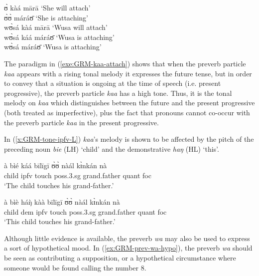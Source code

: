 \begin{exe}
\begin{exe}
\begin{exe}
{\begin{exe}
\begin{exe}
\begin{exe}
\begin{exe}
\begin{exe}
\begin{exe}
\begin{exe}
\begin{xlist}
\begin{exe}
\begin{exe}
\begin{exe}
\begin{exe}
\begin{exe}
\begin{exe}
\begin{exe}
\begin{exe}
\begin{exe}
\begin{exe}
\begin{exe}
\begin{exe}
\begin{exe}
\ea\label{exe:GRM-kaa-attach}
 ʊ̀ kàá mārā   {\rm `She will attach'}\\
   ʊ̀ʊ̀ máráʊ̄      {\rm  `She  is attaching'}\\
wʊ̀sá kàá mārā   {\rm  `Wusa will attach'} \\
wʊ̀sá káá   máráʊ̄  {\rm  `Wusa is attaching'} \\
\textasteriskcentered  wʊ̀sá   máráʊ̄   {\rm    `Wusa is
attaching'}
\z

The paradigm in  (\ref{exe:GRM-kaa-attach}) shows that when the preverb 
particle {\it kaa} appears with a rising tonal melody it  expresses the future 
tense, but  in
order to convey that a situation is ongoing at the time of speech (i.e. present
progressive), the preverb particle {\it kaa} has a high tone. Thus, it is the
tonal melody on {\it kaa} which distinguishes between the future and the present
progressive (both treated as imperfective),  plus the fact that pronouns cannot
co-occur with the preverb particle {\it kaa} in the present progressive. 


In (\ref{x:GRM-tone-ipfv-L}) {\it kaa}'s melody is shown to be affected by   the 
pitch  of   the  preceding  noun {\it bie} (LH) `child' and the demonstrative 
{\it haŋ} (HL) `this'. 


\ea\label{x:GRM-tone-ipfv}
\ea\label{x:GRM-tone-ipfv-H}
\gll à bìé káá bīlīgī ʊ̀ʊ̀ nàál kɪ̀nkán nà\\
{\art} child {\sc ipfv} touch {\sc poss.3.sg} grand.father {\sc quant} {\sc 
foc} \\
\glt `The child touches his grand-father.'

\ex\label{x:GRM-tone-ipfv-L}
\gll à bìè háŋ̀ kàà bīlīgī ʊ̀ʊ̀ nàál kɪ̀nkán nà\\
{\art} child {\sc dem} {\sc ipfv} touch {\sc poss.3.sg} grand.father {\sc 
quant} {\sc 
foc} \\
\glt `This child touches his grand-father.'

\z
\z



Although little evidence is available, the preverb {\it wa} may also be used to
express a sort of hypothetical  mood.  In  (\ref{ex:GRM-prev-wa-hypo}), the
preverb {\it wa} should be seen as contributing a supposition, or a hypothetical
circumstance where
someone would be found calling the number 8. 

\ea\label{ex:GRM-prev-wa-hypo}


\end{exe}
\end{exe}
\end{exe}
\end{exe}
\end{exe}
\end{exe}
\end{exe}
\end{exe}
\end{exe}
\end{exe}
\end{exe}
\end{exe}
\end{exe}
\end{xlist}
\end{exe}
\end{exe}
\end{exe}
\end{exe}
\end{exe}
\end{exe}
\end{exe}}
\end{exe}
\end{exe}
\end{exe}
